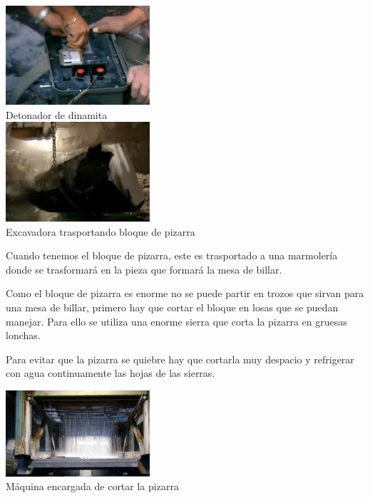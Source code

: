	\begin{center}
	    		\includegraphics[width=0.4\textwidth]{Pantallazo-1.png}			
    \\ \small {Detonador de dinamita} \\[0.5cm]
\includegraphics[width=0.4\textwidth]{Pantallazo-2.png} 
\\ \small {Excavadora trasportando bloque de pizarra}
	\end{center}

 Cuando tenemos el bloque de pizarra, este es trasportado a una marmolería donde se trasformará en la pieza que formará la mesa de billar.


Como el bloque de pizarra es enorme  no se puede partir  en trozos que sirvan para una mesa de billar, primero hay que cortar el bloque en losas que se puedan manejar. Para ello se utiliza una enorme sierra que corta la pizarra en gruesas lonchas. 

Para evitar que la pizarra se quiebre hay que cortarla muy despacio y refrigerar con agua continuamente las hojas de las sierras. 
	\begin{center}
	    		\includegraphics[width=0.4\textwidth]{Pantallazo-3.png}
\\ \small {Máquina encargada de cortar la pizarra}
	\end{center}



